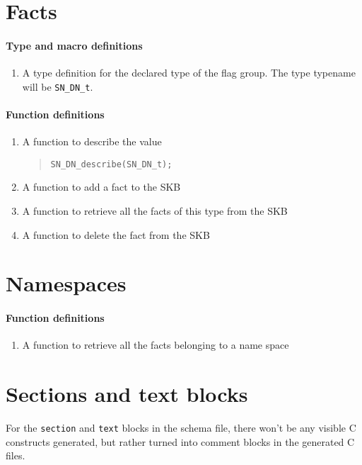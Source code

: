 \documentclass[a4paper,11pt,twoside]{report}
\begin{document}
{{\section{Facts}


\paragraph{Type and macro definitions}
\begin{enumerate}
  \item A type definition for the declared type of the flag group. The 
        type typename will be \texttt{SN\_DN\_t}.
\end{enumerate}

\paragraph{Function definitions}
\begin{enumerate}
  \item A function to describe the value 
        \begin{quote}
          \texttt{SN\_DN\_describe(SN\_DN\_t);}
        \end{quote}
  \item A function to add a fact to the SKB
  \item A function to retrieve all the facts of this type from the SKB
  \item A function to delete the fact from the SKB
\end{enumerate}


\section{Namespaces}

\paragraph{Function definitions}
\begin{enumerate}
    \item A function to retrieve all the facts belonging to a name space
\end{enumerate}


\section{Sections and text blocks}
For the \texttt{section} and \texttt{text} blocks in the schema file, there
won't be any visible C constructs generated, but rather turned into comment
blocks in the generated C files.




}}
\end{document}

